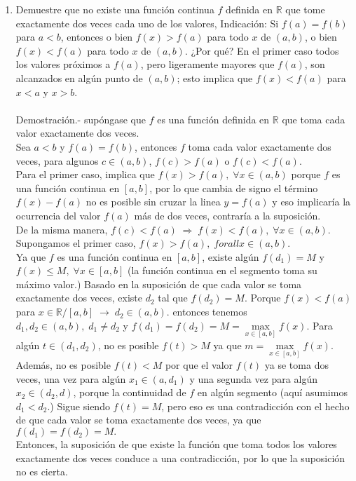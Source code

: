 \begin{enumerate}[\bfseries 1.]
\begin{enumerate}[\bfseries a)]
	\item Demuestre que no existe una función continua $f$ definida en $\mathbb{R}$ que tome exactamente dos veces cada uno de los valores, Indicación: Si $f(a)=f(b)$ para $a<b$, entonces o bien $f(x)>f(a)$ para todo $x$ de $(a,b)$, o bien $f(x)<f(a)$ para todo $x$ de $(a,b)$. ¿Por qué? En el primer caso todos los valores próximos a $f(a)$, pero ligeramente mayores que $f(a)$, son alcanzados en algún punto de $(a,b)$; esto implica que $f(x)<f(a)$ para $x<a$ y $x>b.$\\\\
	    Demostración.-\; supóngase que $f$ es una función definida en $\mathbb{R}$ que toma cada valor exactamente dos veces.\\
	    Sea $a<b$ y $f(a)=f(b)$, entonces $f$ toma cada valor exactamente dos veces, para algunos $c\in (a,b)$, $f(c)>f(a)$ o $f(c)<f(a).$\\
	    Para el primer caso, implica que $f(x)>f(a),\; \forall x \in (a,b)$ porque $f$ es una función continua en $[a,b]$, por lo que cambia de signo el término $f(x)-f(a)$ no es posible sin cruzar la linea $y=f(a)$ y eso implicaría la ocurrencia del valor $f(a)$ más de dos veces, contraría a la suposición.\\
	    De la misma manera, $f(c)<f(a)\; \Rightarrow \; f(x)<f(a),\; \forall x\in (a,b).$\\
	    Supongamos el primer caso, $f(x)>f(a),\; forall x \in (a,b).$\\
	    Ya que $f$ es una función continua en $[a,b]$, existe algún $f(d_1)=M$ y $f(x)\leq M,\; \forall x \in [a,b]$ (la función continua en el segmento toma su máximo valor.) Basado en la suposición de que cada valor se toma exactamente dos veces, existe $d_2$ tal que $f(d_2)=M.$ Porque $f(x)<f(a)$ para $x\in \mathbb{R}  / [a,b] \; \rightarrow \; d_2 \in (a,b).$ entonces tenemos $d_1,d_2 \in (a,b),\; d_1\neq d_2$ y $f(d_1)=f(d_2)=M=\max\limits_{x\in[a,b]}f(x)$. Para algún $t\in (d_1,d_2)$, no es posible $f(t)>M$ ya que $m=\max\limits_{x\in [a,b]} f(x).$ Además, no es posible $f(t)<M$ por que el valor $f(t)$ ya se toma dos veces, una vez para algún $x_1\in(a,d_1)$ y una segunda vez para algún $x_2 \in(d_2,d)$, porque la continuidad de $f$ en algún segmento (aquí asumimos $d_1<d_2$.) Sigue siendo $f(t)=M$, pero eso es una contradicción con el hecho de que cada valor se toma exactamente dos veces, ya que $f(d_1)=f(d_2)=M.$\\
	    Entonces, la suposición de que existe la función que toma todos los valores exactamente dos veces conduce a una contradicción, por lo que la suposición no es cierta.


\end{enumerate}
\end{enumerate}
